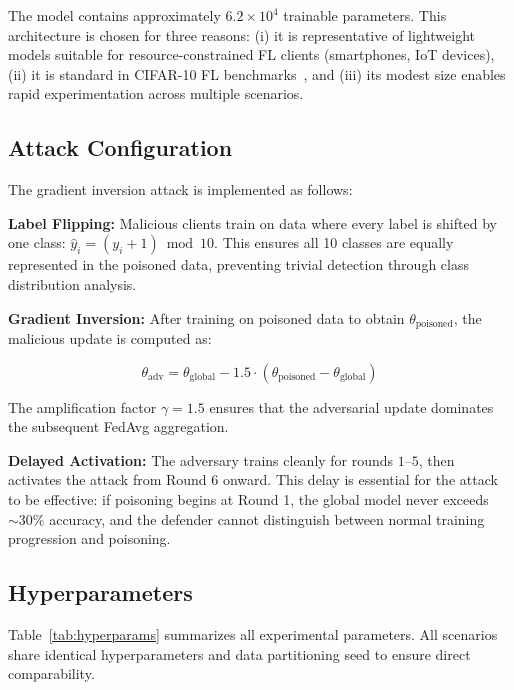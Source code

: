 \documentclass[conference]{IEEEtran}
\begin{document}
The model contains approximately $6.2 \times 10^{4}$ trainable parameters. This architecture is chosen for three reasons: (i) it is representative of lightweight models suitable for resource-constrained FL clients (smartphones, IoT devices), (ii) it is standard in CIFAR-10 FL benchmarks~\cite{mcmahan2017fl}, and (iii) its modest size enables rapid experimentation across multiple scenarios.

\subsection{Attack Configuration}
The gradient inversion attack is implemented as follows:

\noindent\textbf{Label Flipping:} Malicious clients train on data where every label is shifted by one class: $\hat{y}_i = (y_i + 1) \bmod 10$. This ensures all 10 classes are equally represented in the poisoned data, preventing trivial detection through class distribution analysis.

\noindent\textbf{Gradient Inversion:} After training on poisoned data to obtain $\theta_{\text{poisoned}}$, the malicious update is computed as:

\begin{equation}
\theta_{\text{adv}} = \theta_{\text{global}} - 1.5 \cdot (\theta_{\text{poisoned}} - \theta_{\text{global}})
\end{equation}

The amplification factor $\gamma = 1.5$ ensures that the adversarial update dominates the subsequent FedAvg aggregation.

\noindent\textbf{Delayed Activation:} The adversary trains cleanly for rounds $1$--$5$, then activates the attack from Round 6 onward. This delay is essential for the attack to be effective: if poisoning begins at Round 1, the global model never exceeds $\sim 30\%$ accuracy, and the defender cannot distinguish between normal training progression and poisoning.

\subsection{Hyperparameters}
Table~\ref{tab:hyperparams} summarizes all experimental parameters. All scenarios share identical hyperparameters and data partitioning seed to ensure direct comparability.
\end{document}
